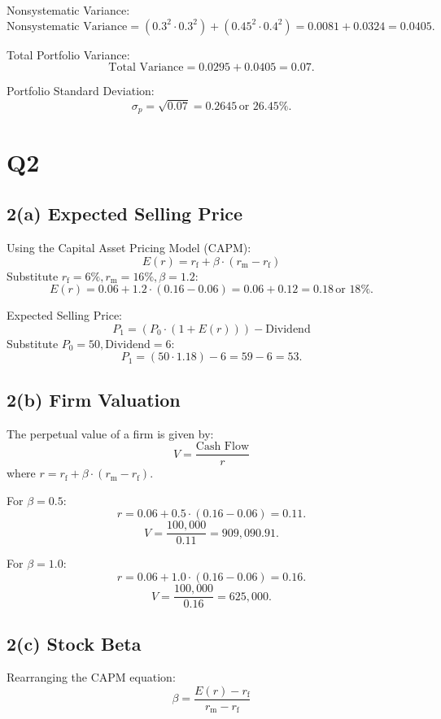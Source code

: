 \documentclass{article}
\begin{document}
Nonsystematic Variance:
\[
\text{Nonsystematic Variance} = (0.3^2 \cdot 0.3^2) + (0.45^2 \cdot 0.4^2) = 0.0081 + 0.0324 = 0.0405.
\]

Total Portfolio Variance:
\[
\text{Total Variance} = 0.0295 + 0.0405 = 0.07.
\]

Portfolio Standard Deviation:
\[
\sigma_p = \sqrt{0.07} = 0.2645 \, \text{or } 26.45\%.
\]

\newpage

\section*{\textbf{Q2}}

\subsection*{\textbf{2(a) Expected Selling Price}}

Using the Capital Asset Pricing Model (CAPM):
\[
E(r) = r_{\text{f}} + \beta \cdot (r_{\text{m}} - r_{\text{f}})
\]
Substitute \( r_{\text{f}} = 6\%, r_{\text{m}} = 16\%, \beta = 1.2 \):
\[
E(r) = 0.06 + 1.2 \cdot (0.16 - 0.06) = 0.06 + 0.12 = 0.18 \, \text{or } 18\%.
\]

Expected Selling Price:
\[
P_1 = (P_0 \cdot (1 + E(r))) - \text{Dividend}
\]
Substitute \( P_0 = 50, \text{Dividend} = 6 \):
\[
P_1 = (50 \cdot 1.18) - 6 = 59 - 6 = 53.
\]

\subsection*{\textbf{2(b) Firm Valuation}}

The perpetual value of a firm is given by:
\[
V = \frac{\text{Cash Flow}}{r}
\]
where \( r = r_{\text{f}} + \beta \cdot (r_{\text{m}} - r_{\text{f}}) \).

For \( \beta = 0.5 \):
\[
r = 0.06 + 0.5 \cdot (0.16 - 0.06) = 0.11.
\]
\[
V = \frac{100,000}{0.11} = 909,090.91.
\]

For \( \beta = 1.0 \):
\[
r = 0.06 + 1.0 \cdot (0.16 - 0.06) = 0.16.
\]
\[
V = \frac{100,000}{0.16} = 625,000.
\]

\subsection*{\textbf{2(c) Stock Beta}}

Rearranging the CAPM equation:
\[
\beta = \frac{E(r) - r_{\text{f}}}{r_{\text{m}} - r_{\text{f}}}
\]
\end{document}

